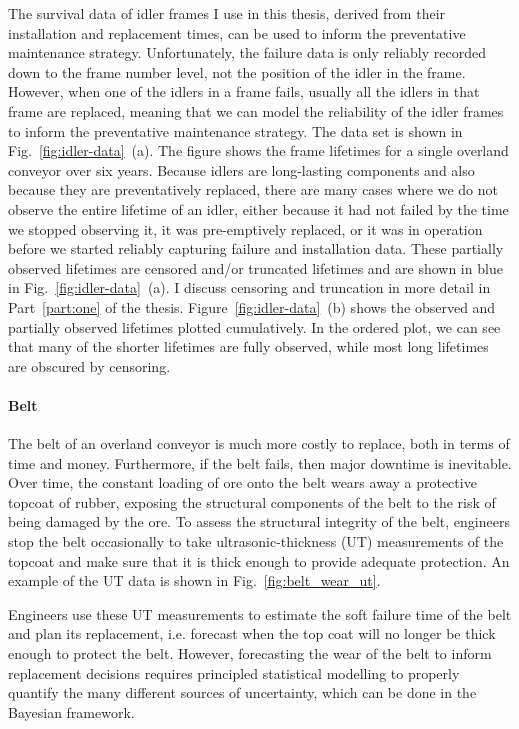 The survival data of idler frames I use in this thesis, derived from their installation and replacement times, can be used to inform the preventative maintenance strategy. Unfortunately, the failure data is only reliably recorded down to the frame number level, not the position of the idler in the frame. However, when one of the idlers in a frame fails, usually all the idlers in that frame are replaced, meaning that we can model the reliability of the idler frames to inform the preventative maintenance strategy. The data set is shown in Fig.~\ref{fig:idler-data}~(a). The figure shows the frame lifetimes for a single overland conveyor over six years. Because idlers are long-lasting components and also because they are preventatively replaced, there are many cases where we do not observe the entire lifetime of an idler, either because it had not failed by the time we stopped observing it, it was pre-emptively replaced, or it was in operation before we started reliably capturing failure and installation data. These partially observed lifetimes are censored and/or truncated lifetimes and are shown in blue in Fig.~\ref{fig:idler-data}~(a). I discuss censoring and truncation in more detail in Part~\ref{part:one} of the thesis. Figure~\ref{fig:idler-data}~(b) shows the observed and partially observed lifetimes plotted cumulatively. In the ordered plot, we can see that many of the shorter lifetimes are fully observed, while most long lifetimes are obscured by censoring.

\paragraph*{Belt}

The belt of an overland conveyor is much more costly to replace, both in terms of time and money. Furthermore, if the belt fails, then major downtime is inevitable. Over time, the constant loading of ore onto the belt wears away a protective topcoat of rubber, exposing the structural components of the belt to the risk of being damaged by the ore. To assess the structural integrity of the belt, engineers stop the belt occasionally to take ultrasonic-thickness (UT) measurements of the topcoat and make sure that it is thick enough to provide adequate protection. An example of the UT data is shown in Fig.~\ref{fig:belt_wear_ut}.

Engineers use these UT measurements to estimate the soft failure time of the belt and plan its replacement, i.e. forecast when the top coat will no longer be thick enough to protect the belt. However, forecasting the wear of the belt to inform replacement decisions requires principled statistical modelling to properly quantify the many different sources of uncertainty, which can be done in the Bayesian framework.

